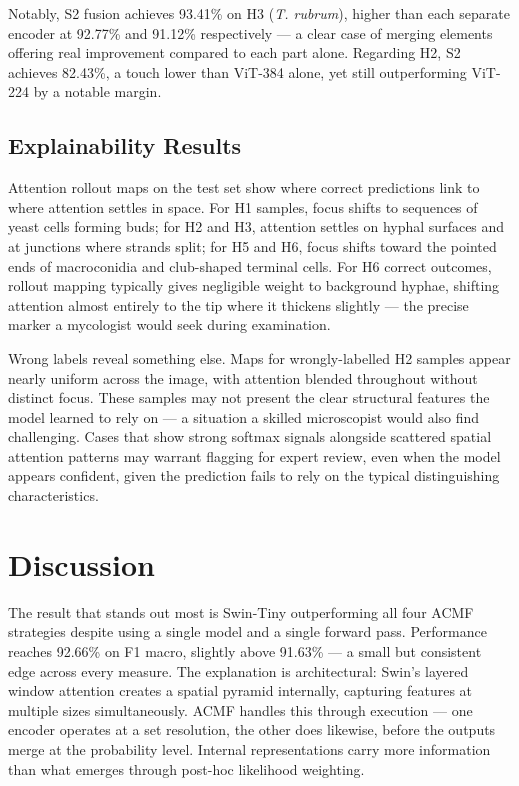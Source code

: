 \documentclass[conference]{IEEEtran}
\begin{document}
Notably, S2 fusion achieves 93.41\% on H3 (\textit{T. rubrum}), higher than
each separate encoder at 92.77\% and 91.12\% respectively --- a clear case of
merging elements offering real improvement compared to each part alone.
Regarding H2, S2 achieves 82.43\%, a touch lower than ViT-384 alone, yet
still outperforming ViT-224 by a notable margin.

\subsection{Explainability Results}

Attention rollout maps on the test set show where correct predictions link to
where attention settles in space. For H1 samples, focus shifts to sequences
of yeast cells forming buds; for H2 and H3, attention settles on hyphal
surfaces and at junctions where strands split; for H5 and H6, focus shifts
toward the pointed ends of macroconidia and club-shaped terminal cells. For
H6 correct outcomes, rollout mapping typically gives negligible weight to
background hyphae, shifting attention almost entirely to the tip where it
thickens slightly --- the precise marker a mycologist would seek during
examination.

Wrong labels reveal something else. Maps for wrongly-labelled H2 samples
appear nearly uniform across the image, with attention blended throughout
without distinct focus. These samples may not present the clear structural
features the model learned to rely on --- a situation a skilled microscopist
would also find challenging. Cases that show strong softmax signals alongside
scattered spatial attention patterns may warrant flagging for expert review,
even when the model appears confident, given the prediction fails to rely on
the typical distinguishing characteristics.

\vspace{-2pt}
\section{Discussion}

The result that stands out most is Swin-Tiny outperforming all four ACMF
strategies despite using a single model and a single forward pass. Performance
reaches 92.66\% on F1 macro, slightly above 91.63\% --- a small but consistent
edge across every measure. The explanation is architectural: Swin's layered
window attention creates a spatial pyramid internally, capturing features at
multiple sizes simultaneously. ACMF handles this through execution --- one
encoder operates at a set resolution, the other does likewise, before the
outputs merge at the probability level. Internal representations carry more
information than what emerges through post-hoc likelihood weighting.
\end{document}
